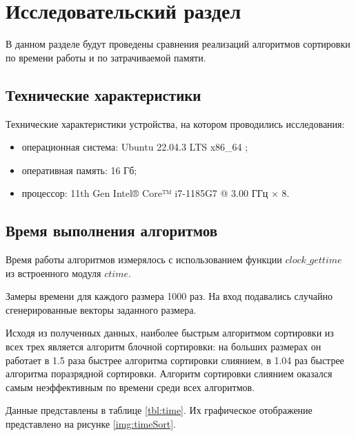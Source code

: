 \chapter{Исследовательский раздел}

В данном разделе будут проведены сравнения реализаций алгоритмов сортировки  по времени работы и по затрачиваемой памяти.

\section{Технические характеристики}

Технические характеристики устройства, на котором проводились исследования: 

\begin{itemize}[label=--]
	\item операционная система: Ubuntu 22.04.3 LTS x86\_64 \cite{os};
	\item оперативная память: 16 Гб;
	\item процессор: 11th Gen Intel® Core™ i7-1185G7 @ 3.00 ГГц × 8.
\end{itemize}

\section{Время выполнения алгоритмов}

Время работы алгоритмов измерялось с использованием функции $clock\_gettime$ из встроенного модуля $ctime$. 

Замеры времени для каждого размера 1000 раз. На вход подавались случайно сгенерированные векторы заданного размера.


Исходя из полученных данных, наиболее быстрым алгоритмом сортировки из всех трех является алгоритм блочной сортировки: на больших размерах он работает в 1.5 раза быстрее алгоритма сортировки слиянием, в 1.04 раз быстрее алгоритма поразрядной сортировки. Алгоритм сортировки слиянием оказался самым неэффективным по времени среди всех алгоритмов.

Данные представлены в таблице \ref{tbl:time}. Их графическое отображение представлено на рисунке \ref{img:timeSort}.

\clearpage

